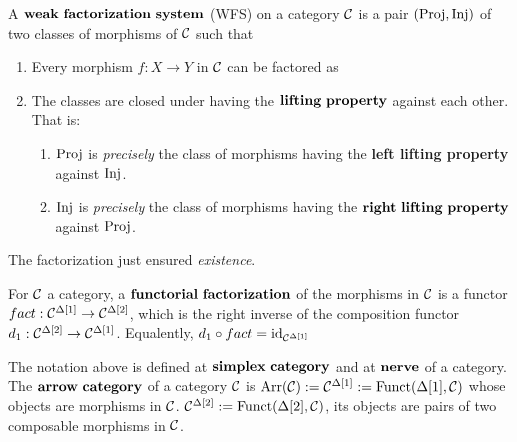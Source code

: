     \begin{defn}
        A $\mbf{weak\ factorization\ system}$ (WFS) on a category $\mathcal{C}$ is
        a pair $(\operatorname{\rm{Proj}}, \operatorname{\rm{Inj}})$ of two classes of morphisms of $\mathcal{C}$ such that

        \begin{enumerate}
            \item Every morphism $f : X \to Y$ in $\mathcal{C}$ can be factored as
            \item The classes are closed under having the $\mathbf{lifting\ property}$ against each other.
            That is:
            \begin{enumerate}
                \item $\operatorname{\rm{Proj}}$ is \emph{precisely} the class of morphisms having the \textbf{left lifting property} against $\operatorname{\rm{Inj}}$.
                \item $\operatorname{\rm{Inj}}$ is \emph{precisely} the class of morphisms having the $\mbf{right\ lifting\ property}$ against $\operatorname{\rm{Proj}}$.
            \end{enumerate}
        \end{enumerate}

    \end{defn}

    \begin{rem}
        The factorization just ensured \emph{existence}.
    \end{rem}

    \begin{defn}
        For $\mathcal{C}$ a category, a $\mathbf{functorial\ factorization}$ of the morphisms in $\mathcal{C}$ is a functor
        $ fact : \mathcal{C}^{\Delta[1]} \to \mathcal{C}^{\Delta[2]} $, which is the right inverse of
        the composition functor $d_1 : \mathcal{C}^{\Delta[2]} \to \mathcal{C}^{\Delta[1]} $. Equalently,
        $ d_1 \circ fact = \mathrm{id}_{\mathcal{C}^{\Delta[1]}} $
    \end{defn}
    
    \begin{rem}
        The notation above is defined at $\mathbf{simplex\ category}$ and at $\mathbf{nerve}$ of a category.
        The $\mathbf{arrow\ category}$ of a category $\mathcal{C}$ is
        $\operatorname{\rm{Arr}}(\mathcal{C}) := \mathcal{C}^{\Delta[1]} := \mathrm{Funct}(\Delta[1], \mathcal{C})$ whose objects are morphisms in $\mathcal{C}$.
        $\mathcal{C}^{\Delta[2]} := \mathrm{Funct}(\Delta[2], \mathcal{C})$, its objects are pairs of two composable morphisms in $\mathcal{C}$.
    \end{rem}

